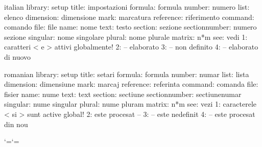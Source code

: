 \startmessages  italian library: setup
        title:  impostazioni
      formula:  formula
       number:  numero
         list:  elenco
    dimension:  dimensione
         mark:  marcatura
    reference:  riferimento
      command:  comando
         file:  file
         name:  nome
         text:  testo
      section:  sezione
sectionnumber:  numero sezione
     singular:  nome singolare
       plural:  nome plurale
       matrix:  n*m
          see:  vedi
            1:  caratteri < e > attivi globalmente!
            2:  -- elaborato
            3:  -- non definito
            4:  -- elaborato di nuovo
\stopmessages

\startmessages  romanian library: setup
         title:  setari
       formula:  formula
        number:  numar
          list:  lista
     dimension:  dimensiune
          mark:  marcaj
     reference:  referinta
       command:  comanda
          file:  fisier
          name:  nume
          text:  text
       section:  sectiune
 sectionnumber:  sectiunenumar %
      singular:  nume singular
        plural:  nume pluram
        matrix:  n*m
           see:  vezi
             1:  caracterele < si > sunt active global!
             2:  este procesat --
             3:  -- este nedefinit
             4:  -- este procesat din nou
\stopmessages


\interfacetranslationtrue






\def\setupnumfont {}
\def\setuptxtfont {\tttf}
\def\setupvarfont {\ttsl}
\def\setupoptfont {\ttsl}
\def\setupalwcolor{}
\def\setupoptcolor{darkgray}




\def\stpt#1{{\tttf#1}}
\def\stpr#1{#1*}
\def\stpv#1{{\setupvarfont#1}}

\bgroup \catcode`\<=\active \catcode`\>=\other

